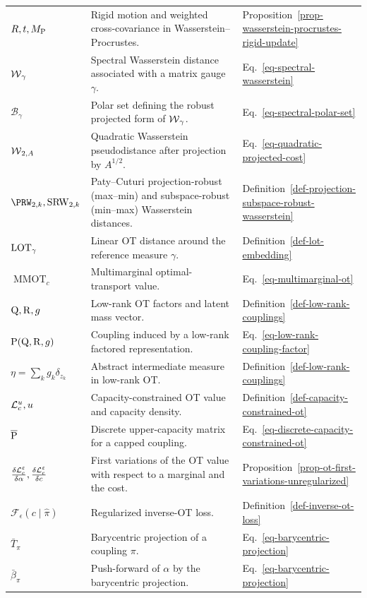 {\begin{longtable}{>{\raggedright\arraybackslash}p{}
                  >{\raggedright\arraybackslash}p{}
                  >{\raggedright\arraybackslash}p{}}
$R,t,M_\P$ & Rigid motion and weighted cross-covariance in Wasserstein--Procrustes. & Proposition~\ref{prop-wasserstein-procrustes-rigid-update} \\
$\Wass_\gamma$ & Spectral Wasserstein distance associated with a matrix gauge $\gamma$. & Eq.~\eqref{eq-spectral-wasserstein} \\
$\mathcal B_\gamma$ & Polar set defining the robust projected form of $\Wass_\gamma$. & Eq.~\eqref{eq-spectral-polar-set} \\
$\Wass_{2,A}$ & Quadratic Wasserstein pseudodistance after projection by $A^{1/2}$. & Eq.~\eqref{eq-quadratic-projected-cost} \\
$\PRW_{2,k},\SRW_{2,k}$ & Paty--Cuturi projection-robust (max--min) and subspace-robust (min--max) Wasserstein distances. & Definition~\ref{def-projection-subspace-robust-wasserstein} \\
$\LOT_\gamma$ & Linear OT distance around the reference measure $\gamma$. & Definition~\ref{def-lot-embedding} \\
$\operatorname{MMOT}_c$ & Multimarginal optimal-transport value. & Eq.~\eqref{eq-multimarginal-ot} \\
$\Q,\R,g$ & Low-rank OT factors and latent mass vector. & Definition~\ref{def-low-rank-couplings} \\
$\P(\Q,\R,g)$ & Coupling induced by a low-rank factored representation. & Eq.~\eqref{eq-low-rank-coupling-factor} \\
$\eta=\sum_k g_k\delta_{z_k}$ & Abstract intermediate measure in low-rank OT\@. & Definition~\ref{def-low-rank-couplings} \\
$\MK_c^u,u$ & Capacity-constrained OT value and capacity density. & Definition~\ref{def-capacity-constrained-ot} \\
$\overline{\P}$ & Discrete upper-capacity matrix for a capped coupling. & Eq.~\eqref{eq-discrete-capacity-constrained-ot} \\
$\frac{\delta \MK_c^\epsilon}{\delta\alpha},\frac{\delta \MK_c^\epsilon}{\delta c}$ & First variations of the OT value with respect to a marginal and the cost. & Proposition~\ref{prop-ot-first-variations-unregularized} \\
$\mathcal F_\epsilon(c\mid\widehat\pi)$ & Regularized inverse-OT loss. & Definition~\ref{def-inverse-ot-loss} \\
$\bar T_\pi$ & Barycentric projection of a coupling $\pi$. & Eq.~\eqref{eq-barycentric-projection} \\
$\bar\beta_\pi$ & Push-forward of $\alpha$ by the barycentric projection. & Eq.~\eqref{eq-barycentric-projection} \\

\end{longtable}}
